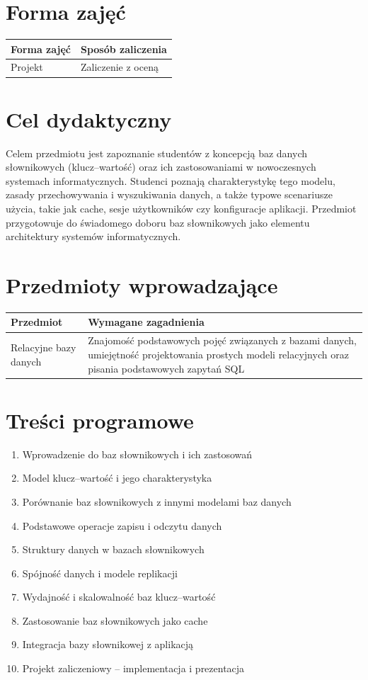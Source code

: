 \documentclass[12pt, a4paper]{article}
\begin{document}
\section{Forma zajęć}

\begin{tabular}{ll}
  \hline
  \textbf{Forma zajęć} & \textbf{Sposób zaliczenia} \\
  \hline
  Projekt & Zaliczenie z oceną \\
  \hline
\end{tabular}

\section{Cel dydaktyczny}

Celem przedmiotu jest zapoznanie studentów z koncepcją baz danych słownikowych (klucz–wartość) oraz ich zastosowaniami w nowoczesnych systemach informatycznych. Studenci poznają charakterystykę tego modelu, zasady przechowywania i wyszukiwania danych, a także typowe scenariusze użycia, takie jak cache, sesje użytkowników czy konfiguracje aplikacji. Przedmiot przygotowuje do świadomego doboru baz słownikowych jako elementu architektury systemów informatycznych.

\section{Przedmioty wprowadzające}

\begin{tabularx}{\textwidth}{lX}
  \hline
  \textbf{Przedmiot} & \textbf{Wymagane zagadnienia} \\
  \hline
  Relacyjne bazy danych & Znajomość podstawowych pojęć związanych z bazami danych, umiejętność projektowania prostych modeli relacyjnych oraz pisania podstawowych zapytań SQL \\
  \hline
\end{tabularx}

\section{Treści programowe}

\begin{enumerate}
  \item Wprowadzenie do baz słownikowych i ich zastosowań
  \item Model klucz–wartość i jego charakterystyka
  \item Porównanie baz słownikowych z innymi modelami baz danych
  \item Podstawowe operacje zapisu i odczytu danych
  \item Struktury danych w bazach słownikowych
  \item Spójność danych i modele replikacji
  \item Wydajność i skalowalność baz klucz–wartość
  \item Zastosowanie baz słownikowych jako cache
  \item Integracja bazy słownikowej z aplikacją
  \item Projekt zaliczeniowy – implementacja i prezentacja
\end{enumerate}
\end{document}

